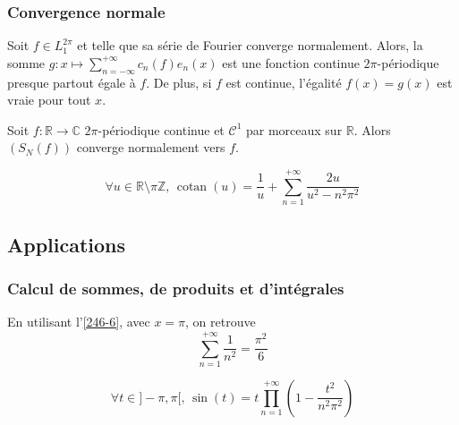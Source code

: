   \subsubsection{Convergence normale}


  \begin{proposition}
    Soit $f \in L_1^{2\pi}$ et telle que sa série de Fourier converge normalement. Alors, la somme $g : x \mapsto \sum_{n=-\infty}^{+\infty} c_n(f) e_n(x)$ est une fonction continue $2\pi$-périodique presque partout égale à $f$. De plus, si $f$ est continue, l'égalité $f(x) = g(x)$ est vraie pour tout $x$.
  \end{proposition}

  \begin{proposition}
    Soit $f : \mathbb{R} \rightarrow \mathbb{C}$ $2\pi$-périodique continue et $\mathcal{C}^1$ par morceaux sur $\mathbb{R}$. Alors $(S_N(f))$ converge normalement vers $f$.
  \end{proposition}


  \begin{application}
    \[ \forall u \in \mathbb{R} \setminus \pi \mathbb{Z}, \, \operatorname{cotan}(u) = \frac{1}{u} + \sum_{n=1}^{+\infty} \frac{2u}{u^2 - n^2 \pi^2} \]
  \end{application}

  \subsection{Applications}

  \subsubsection{Calcul de sommes, de produits et d'intégrales}


  \begin{application}
    En utilisant l'\cref{246-6}, avec $x = \pi$, on retrouve
    \[ \sum_{n = 1}^{+\infty} \frac{1}{n^2} = \frac{\pi^2}{6} \]
  \end{application}

  \begin{application}
    \[ \forall t \in ]-\pi, \pi[, \, \sin(t) = t \prod_{n=1}^{+\infty} \left( 1 - \frac{t^2}{n^2\pi^2} \right) \]
  \end{application}

